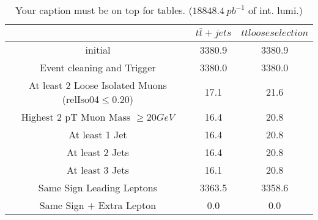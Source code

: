 \documentclass{article}
\begin{document}
\begin{table}
\caption{Your caption must be on top for tables. ($18848.4~pb^{-1}$ of int. lumi.)}
\label{tab:}
\centering
\begin{tabular}{|c|cc|}
\toprule
&$t\bar{t}+jets$	&$tt loose selection$	\\

\midrule
initial&	3380.9	&3380.9	\\

Event cleaning and Trigger&	3380.0	&3380.0	\\

At least 2 Loose Isolated Muons (relIso04$\leq 0.20$)&	17.1	&21.6	\\

Highest 2 pT Muon Mass $\geq 20 GeV$&	16.4	&20.8	\\

At least 1  Jet&	16.4	&20.8	\\

At least 2 Jets&	16.4	&20.8	\\

At least 3 Jets&	16.1	&20.8	\\

Same Sign Leading Leptons&	3363.5	&3358.6	\\

Same Sign $+$ Extra Lepton&	0.0	&0.0	\\

\bottomrule
\end{tabular}
\end{table}
\end{document}

